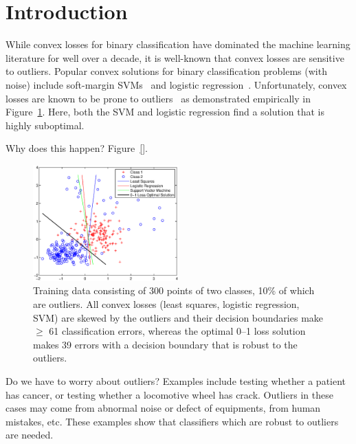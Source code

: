 \section{Introduction}
\label{cha:intro}

While convex losses for binary classification have dominated the
machine learning literature for well over a decade, it is well-known
that convex losses are sensitive to outliers.  Popular convex
solutions for binary classification problems (with noise) include
soft-margin SVMs~\cite{} and logistic regression~\cite{}.
Unfortunately, convex losses are known to be prone to
outliers~\cite{wu07,servidio?} as demonstrated empirically in
Figure~\ref{fig:svm_failure}.  Here, both the SVM and logistic
regression find a solution that is highly suboptimal.

Why does this happen?  Figure~\ref{}.

\begin{figure}[t!]
\vspace{-3mm}
\hspace{-3mm} \includegraphics[width=0.50\textwidth]{images/fig11_svm_failure2.eps}
\vspace{-9mm}
\caption{ \footnotesize Training data consisting of 300 points of two
  classes, 10\% of which are outliers.  All convex losses (least
  squares, logistic regression, SVM) are skewed by the outliers and
  their decision boundaries make $\geq$ 61 classification errors,
  whereas the optimal 0--1 loss solution makes 39 errors with a decision
  boundary that is robust to the outliers.}
\label{fig:svm_failure}
\vspace{-3mm}
\end{figure}

Do we have to worry about outliers?  Examples include testing whether
a patient has cancer, or testing whether a locomotive wheel has
crack. Outliers in these cases may come from abnormal noise or defect
of equipments, from human mistakes, etc. These examples show that
classifiers which are robust to outliers are needed.

